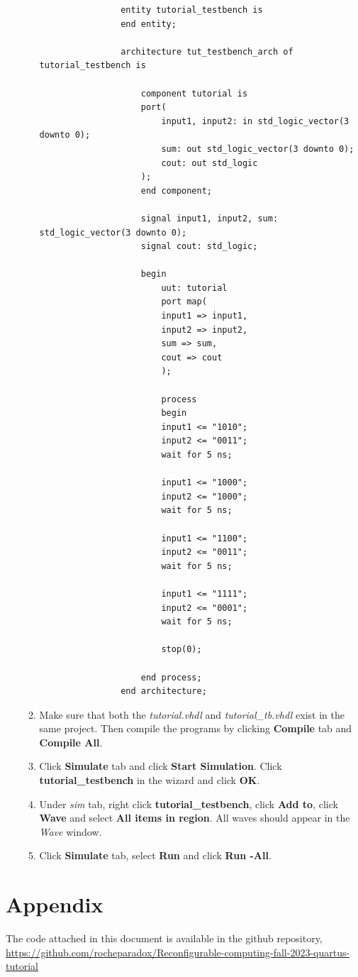 \documentclass{article}
\begin{document}
\begin{enumerate}
\begin{enumerate}
\begin{lstlisting}
				entity tutorial_testbench is
				end entity;
				
				architecture tut_testbench_arch of tutorial_testbench is
				
					component tutorial is
					port(
						input1, input2: in std_logic_vector(3 downto 0);
						sum: out std_logic_vector(3 downto 0);
						cout: out std_logic
					);
					end component;
					
					signal input1, input2, sum: std_logic_vector(3 downto 0);
					signal cout: std_logic;
					
					begin
						uut: tutorial
						port map(
						input1 => input1,
						input2 => input2,
						sum => sum,
						cout => cout
						);
						
						process
						begin
						input1 <= "1010";
						input2 <= "0011";
						wait for 5 ns;
						
						input1 <= "1000";
						input2 <= "1000";
						wait for 5 ns;
						
						input1 <= "1100";
						input2 <= "0011";
						wait for 5 ns;
						
						input1 <= "1111";
						input2 <= "0001";
						wait for 5 ns;
						
						stop(0);
					
					end process;
				end architecture;
			\end{lstlisting}
			\item Make sure that both the \textit{tutorial.vhdl} and \textit{tutorial\_tb.vhdl} exist in the same project. Then compile the programs by clicking \textbf{Compile} tab and \textbf{Compile All}.
			\item Click \textbf{Simulate} tab and click \textbf{Start Simulation}. Click \textbf{tutorial\_testbench} in the wizard and click \textbf{OK}.
			\item Under \textit{sim} tab, right click \textbf{tutorial\_testbench}, click \textbf{Add to}, click \textbf{Wave} and select \textbf{All items in region}. All waves should appear in the \textit{Wave} window.
			\item Click \textbf{Simulate} tab, select \textbf{Run} and click \textbf{Run -All}.
			
		\end{enumerate}
	\end{enumerate}

	\section{Appendix}
	The code attached in this document is available in the github repository, \url{https://github.com/rocheparadox/Reconfigurable-computing-fall-2023-quartus-tutorial}
\end{document}
